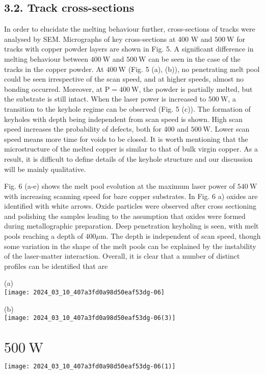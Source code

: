 \documentclass[10pt]{article}
\begin{document}
\subsection*{3.2. Track cross-sections}
In order to elucidate the melting behaviour further, cross-sections of tracks were analysed by SEM. Micrographs of key cross-sections at 400 $\mathrm{W}$ and $500 \mathrm{~W}$ for tracks with copper powder layers are shown in Fig. 5. A significant difference in melting behaviour between $400 \mathrm{~W}$ and $500 \mathrm{~W}$ can be seen in the case of the tracks in the copper powder. At $400 \mathrm{~W}$ (Fig. 5 (a), (b)), no penetrating melt pool could be seen irrespective of the scan speed, and at higher speeds, almost no bonding occurred. Moreover, at $\mathrm{P}=400 \mathrm{~W}$, the powder is partially melted, but the substrate is still intact. When the laser power is increased to $500 \mathrm{~W}$, a transition to the keyhole regime can be observed (Fig. 5 (c)). The formation of keyholes with depth being independent from scan speed is shown. High scan speed increases the probability of defects, both for 400 and $500 \mathrm{~W}$. Lower scan speed means more time for voids to be closed. It is worth mentioning that the microstructure of the melted copper is similar to that of bulk virgin copper. As a result, it is difficult to define details of the keyhole structure and our discussion will be mainly qualitative.

Fig. 6 (a-e) shows the melt pool evolution at the maximum laser power of $540 \mathrm{~W}$ with increasing scanning speed for bare copper substrates. In Fig. 6 a) oxides are identified with white arrows. Oxide particles were observed after cross sectioning and polishing the samples leading to the assumption that oxides were formed during metallographic preparation. Deep penetration keyholing is seen, with melt pools reaching a depth of $400 \mu \mathrm{m}$. The depth is independent of scan speed, though some variation in the shape of the melt pools can be explained by the instability of the laser-matter interaction. Overall, it is clear that a number of distinct profiles can be identified that are

(a)\\
\texttt{[image: 2024\_03\_10\_407a3fd0a98d50eaf53dg-06]}

(b)\\
\texttt{[image: 2024\_03\_10\_407a3fd0a98d50eaf53dg-06(3)]}

\section*{$500 \mathrm{~W}$}
\begin{center}
\texttt{[image: 2024\_03\_10\_407a3fd0a98d50eaf53dg-06(1)]}
\end{center}
\end{document}
